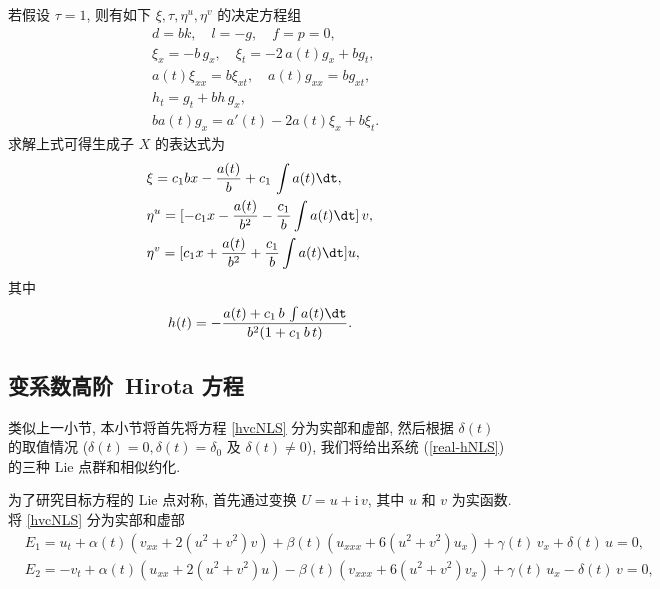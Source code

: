 若假设 $\tau=1$, 则有如下 $\xi, \tau, \eta^u, \eta^v$ 的决定方程组
\begin{equation}
\begin{aligned}
&d=bk,\quad l=-g,\quad f=p=0,\\
&\xi_x=-b\,g_x,\quad \xi_t=-2\,a(t)g_x+bg_t,\\
&a(t)\xi_{xx}=b\xi_{xt},\quad a(t)g_{xx}=bg_{xt},\\
&h_t=g_t+bh\,g_x,\\
&ba(t)g_x=a'(t)-2a(t)\xi_x+b\xi_t.
\end{aligned}
\end{equation}
求解上式可得生成子 $X$ 的表达式为
\begin{equation}
\begin{aligned}
&\xi=c_1 b x-\frac{a(t)}{b}+c_1\,\int a(t)\dt,\\
&\eta^u=[-c_1x-\frac{a(t)}{b^2}-\frac{c_1}{b}\int a(t)\dt]\,v,\\
&\eta^v=[c_1x+\frac{a(t)}{b^2}+\frac{c_1}{b}\int a(t)\dt]u,
\end{aligned}
\end{equation}
其中
\begin{equation*}
h(t)=-\frac{a(t)+c_1\,b\,\int a(t)\dt}{b^2(1+c_1\,b\,t)}.
\end{equation*}

\subsection{变系数高阶~Hirota 方程}
类似上一小节, 本小节将首先将方程 \eqref{hvcNLS} 分为实部和虚部, 然后根据 $\delta(t)$ 的取值情况 ($\delta(t)=0, \delta(t)=\delta_0$ 及 $\delta(t)\neq 0$), 我们将给出系统 (\ref{real-hNLS}) 的三种 Lie 点群和相似约化.



为了研究目标方程的 Lie 点对称, 首先通过变换
$U=u+\text{i}\,v$, 其中 $u$ 和 $v$ 为实函数.
将 \eqref{hvcNLS} 分为实部和虚部
\begin{equation}\label{real-hNLS}
\begin{aligned}
&E_1=u_t+\alpha(t) (v_{xx}+2(u^2+v^2)v)+\beta(t)(u_{xxx}+6(u^2+v^2)u_x) +\gamma(t)\,v_x+\delta(t)\,u=0,\\
&E_2=-v_t+\alpha(t)(u_{xx}+2(u^2+v^2)u)-\beta(t)(v_{xxx}+6(u^2+v^2)v_x) +\gamma(t)\,u_x-\delta(t)\,v=0,
\end{aligned}
\end{equation}

